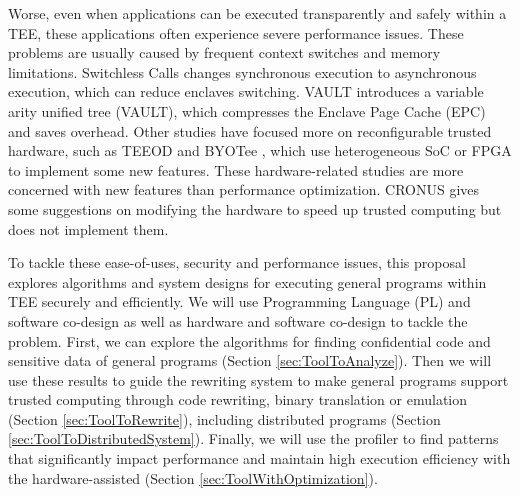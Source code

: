 Worse, even when applications can be executed transparently and safely within a TEE,
these applications often experience severe performance issues.
These problems are usually caused by frequent context switches and memory limitations.
Switchless Calls \cite{Tian2018SwitchlessCM} changes synchronous execution
to asynchronous execution, which can reduce enclaves switching.
VAULT \cite{Taassori2018VAULTRP} introduces a variable arity unified tree (VAULT),
which compresses the Enclave Page Cache (EPC) and saves overhead.
Other studies have focused more on reconfigurable trusted hardware,
such as TEEOD \cite{Pereira2021TowardsAT} and BYOTee \cite{Armanuzzaman2022BYOTeeTB},
which use heterogeneous SoC or FPGA to implement some new features.
These hardware-related studies are more concerned with new features than
performance optimization. CRONUS \cite{Jiang2022CRONUSFS} gives some suggestions
on modifying the hardware to speed up trusted computing but does not
implement them.

To tackle these ease-of-uses, security and performance issues, this proposal explores
algorithms and system designs for executing general programs within TEE securely and efficiently.
We will use Programming Language (PL) and software co-design as well as hardware and software co-design
to tackle the problem.
First, we can explore the algorithms for finding confidential code and sensitive data of
general programs (Section \ref{sec:ToolToAnalyze}). Then we will use these results
to guide the rewriting system to make general programs support trusted computing through
code rewriting, binary translation or emulation (Section \ref{sec:ToolToRewrite}),
including distributed programs (Section \ref{sec:ToolToDistributedSystem}).
Finally, we will use the profiler to find patterns that significantly impact
performance and maintain high execution efficiency with the hardware-assisted
(Section \ref{sec:ToolWithOptimization}).
